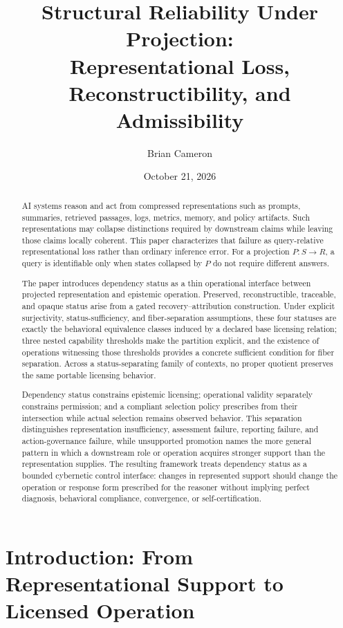 \documentclass[11pt]{article}
\title{Structural Reliability Under Projection:\\
Representational Loss, Reconstructibility, and Admissibility}
\author{Brian Cameron}
\date{October 21, 2026}
\theoremstyle{definition}
\theoremstyle{remark}
\begin{document}
\maketitle

\begin{abstract}
AI systems reason and act from compressed representations such as prompts, summaries, retrieved passages, logs, metrics, memory, and policy artifacts. Such representations may collapse distinctions required by downstream claims while leaving those claims locally coherent. This paper characterizes that failure as query-relative representational loss rather than ordinary inference error. For a projection \(P:S\rightarrow R\), a query is identifiable only when states collapsed by \(P\) do not require different answers.

The paper introduces dependency status as a thin operational interface between projected representation and epistemic operation. Preserved, reconstructible, traceable, and opaque status arise from a gated recovery--attribution construction. Under explicit surjectivity, status-sufficiency, and fiber-separation assumptions, these four statuses are exactly the behavioral equivalence classes induced by a declared base licensing relation; three nested capability thresholds make the partition explicit, and the existence of operations witnessing those thresholds provides a concrete sufficient condition for fiber separation. Across a status-separating family of contexts, no proper quotient preserves the same portable licensing behavior.

Dependency status constrains epistemic licensing; operational validity separately constrains permission; and a compliant selection policy prescribes from their intersection while actual selection remains observed behavior. This separation distinguishes representation insufficiency, assessment failure, reporting failure, and action-governance failure, while unsupported promotion names the more general pattern in which a downstream role or operation acquires stronger support than the representation supplies. The resulting framework treats dependency status as a bounded cybernetic control interface: changes in represented support should change the operation or response form prescribed for the reasoner without implying perfect diagnosis, behavioral compliance, convergence, or self-certification.
\end{abstract}

\section{Introduction: From Representational Support to Licensed Operation}
\end{document}

